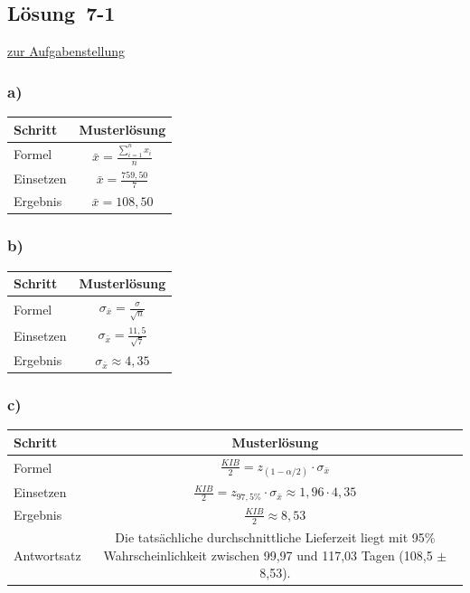 \documentclass[
  11pt,
  ngerman,
  a4paper,
]{report}
\begin{document}
\hypertarget{loesung-7-1}{%
\subsection{Lösung~7-1}\label{loesung-7-1}}

\protect\hyperlink{aufgabe-7-1}{zur Aufgabenstellung}

\hypertarget{a-17}{%
\subsubsection{a)}\label{a-17}}

\begin{table}[H]
\centering
\begin{tabular}{lc}
\toprule
Schritt & Musterlösung\\
\midrule
Formel & $\bar{x}=\frac{\sum\limits_{i=1}^{n}x_{i}}{n}$\\
Einsetzen & $\bar{x}=\frac{759{,}50}{7}$\\
Ergebnis & $\bar{x}=108{,}50$\\
\bottomrule
\end{tabular}
\end{table}

\hypertarget{b-18}{%
\subsubsection{b)}\label{b-18}}

\begin{table}[H]
\centering
\begin{tabular}{lc}
\toprule
Schritt & Musterlösung\\
\midrule
Formel & $\sigma_{\bar{x}}=\frac{\sigma}{\sqrt{n}}$\\
Einsetzen & $\sigma_{\bar{x}}=\frac{11{,}5}{\sqrt{7}}$\\
Ergebnis & $\sigma_{\bar{x}}\approx4{,}35$\\
\bottomrule
\end{tabular}
\end{table}

\hypertarget{c-12}{%
\subsubsection{c)}\label{c-12}}

\begin{table}[H]
\centering
\begin{tabular}{lc}
\toprule
Schritt & Musterlösung\\
\midrule
Formel & $\frac{\mathit{KIB}}{2} = z_{(1-\alpha/2)} \cdot \sigma_{\bar{x}}$\\
Einsetzen & $\frac{\mathit{KIB}}{2} = z_{97{,}5\%} \cdot \sigma_{\bar{x}} \approx 1{,}96 \cdot 4{,}35$\\
Ergebnis & $\frac{\mathit{KIB}}{2} \approx 8{,}53$\\
Antwortsatz & Die tatsächliche durchschnittliche Lieferzeit liegt mit 95\% Wahrscheinlichkeit zwischen 99,97 und 117,03 Tagen (108,5 $\pm$ 8,53).\\
\bottomrule
\end{tabular}
\end{table}
\end{document}
